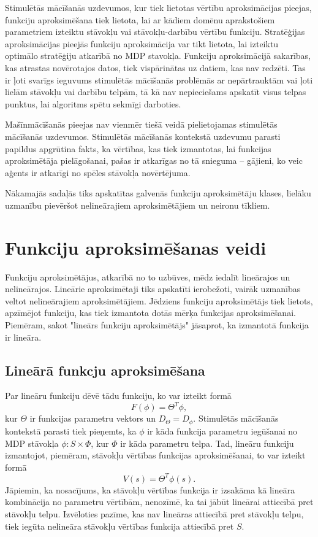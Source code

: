 \documentclass{ludis} %
\begin{document}
Stimulētās mācīšanās uzdevumos, kur tiek lietotas vērtību aproksimācijas pieejas, funkciju aproksimēšana tiek lietota, lai ar kādiem domēnu aprakstošiem parametriem izteiktu stāvokļu vai stāvokļu-darbību vērtību funkciju. Stratēģijas aproksimācijas pieejās funkciju aproksimācija var tikt lietota, lai izteiktu optimālo stratēģiju atkarībā no MDP stavokļa.
Funkciju aproksimācijā sakarības, kas atrastas novērotajos datos, tiek vispārinātas uz datiem, kas nav redzēti. Tas ir ļoti svarīgs ieguvums stimulētās mācīšanās problēmās ar nepārtrauktām vai ļoti lielām stāvokļu vai darbību telpām, tā kā nav nepieciešams apskatīt visus telpas punktus, lai algoritms spētu sekmīgi darboties.

Mašīnmācīšanās pieejas nav vienmēr tiešā veidā pielietojamas stimulētās mācīšanās uzdevumos.
Stimulētās mācīšanās kontekstā uzdevumu parasti papildus apgrūtina fakts, ka vērtības, kas tiek izmantotas, lai funkcijas aproksimētāja pielāgošanai, pašas ir atkarīgas no tā snieguma -- gājieni, ko veic aģents ir atkarīgi no spēles stāvokļa novērtējuma.

Nākamajās sadaļās tiks apskatītas galvenās funkciju aproksimētāju klases, lielāku uzmanību pievēršot nelineārajiem aproksimētājiem un neironu tīkliem.

\section{Funkciju aproksimēšanas veidi}
Funkciju aproksimētājus, atkarībā no to uzbūves, mēdz iedalīt lineārajos un nelineārajos. Lineārie aproksimētaji tiks apskatīti ierobežoti, vairāk uzmanības veltot nelineārajiem aproksimētājiem.
Jēdziens funkciju aproksimētājs tiek lietots, apzīmējot funkciju, kas tiek izmantota dotās mērķa funkcijas aproksimēšanai.
Piemēram, sakot "lineārs funkciju aproksimētājs" jāsaprot, ka izmantotā funkcija ir lineāra.

\subsection{Lineārā funkcju aproksimēšana}
Par lineāru funkciju dēvē tādu funkciju, ko var izteikt formā
\[
	F(\phi) = \Theta^T \phi,
\]
kur $\Theta$ ir funkcijas parametru vektors un $D_\Theta = D_\phi$.
Stimulētās mācīšanās kontekstā parasti tiek pieņemts, ka $\phi$ ir kāda funkcija parametru iegūšanai no MDP stāvokļa $\phi : S \times \Phi$, kur $\Phi$ ir kāda parametru telpa.
Tad, lineāru funkciju izmantojot, piemēram, stāvokļu vērtības funkcijas aproksimēšanai, to var izteikt formā
\[
	V(s) = \Theta^T \phi(s).
\]
Jāpiemin, ka nosacījums, ka stāvokļu vērtības funkcija ir izsakāma kā lineāra kombinācija no parametru vērtībām, nenozīmē, ka tai jābūt lineārai attiecībā pret stāvokļu telpu.
Izvēloties pazīme, kas nav lineāras attiecībā pret stāvokļu telpu, tiek iegūta nelineāra stāvokļu vērtības funkcija attiecībā pret $S$.
\end{document}
